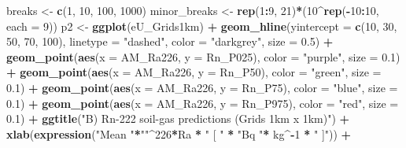 \documentclass[
  12pt,
]{article}
\newenvironment{Shaded}{\begin{snugshade}}{\end{snugshade}}
\newcommand{\DataTypeTok}[1]{\textcolor[rgb]{0.13,0.29,0.53}{#1}}
\newcommand{\DecValTok}[1]{\textcolor[rgb]{0.00,0.00,0.81}{#1}}
\newcommand{\FloatTok}[1]{\textcolor[rgb]{0.00,0.00,0.81}{#1}}
\newcommand{\KeywordTok}[1]{\textcolor[rgb]{0.13,0.29,0.53}{\textbf{#1}}}
\newcommand{\NormalTok}[1]{#1}
\newcommand{\OperatorTok}[1]{\textcolor[rgb]{0.81,0.36,0.00}{\textbf{#1}}}
\newcommand{\StringTok}[1]{\textcolor[rgb]{0.31,0.60,0.02}{#1}}
\begin{document}
\begin{Shaded}
\begin{Highlighting}[]
\NormalTok{breaks \textless{}{-}}\StringTok{ }\KeywordTok{c}\NormalTok{(}\DecValTok{1}\NormalTok{, }\DecValTok{10}\NormalTok{, }\DecValTok{100}\NormalTok{, }\DecValTok{1000}\NormalTok{)}
\NormalTok{minor\_breaks \textless{}{-}}\StringTok{ }\KeywordTok{rep}\NormalTok{(}\DecValTok{1}\OperatorTok{:}\DecValTok{9}\NormalTok{, }\DecValTok{21}\NormalTok{)}\OperatorTok{*}\NormalTok{(}\DecValTok{10}\OperatorTok{\^{}}\KeywordTok{rep}\NormalTok{(}\OperatorTok{{-}}\DecValTok{10}\OperatorTok{:}\DecValTok{10}\NormalTok{, }\DataTypeTok{each =} \DecValTok{9}\NormalTok{))}
\NormalTok{p2 \textless{}{-}}\StringTok{ }\KeywordTok{ggplot}\NormalTok{(eU\_Grids1km) }\OperatorTok{+}
\StringTok{  }\KeywordTok{geom\_hline}\NormalTok{(}\DataTypeTok{yintercept =} \KeywordTok{c}\NormalTok{(}\DecValTok{10}\NormalTok{, }\DecValTok{30}\NormalTok{, }\DecValTok{50}\NormalTok{, }\DecValTok{70}\NormalTok{, }\DecValTok{100}\NormalTok{),}
             \DataTypeTok{linetype =} \StringTok{"dashed"}\NormalTok{, }\DataTypeTok{color =} \StringTok{"darkgrey"}\NormalTok{, }\DataTypeTok{size =} \FloatTok{0.5}\NormalTok{) }\OperatorTok{+}
\StringTok{  }\KeywordTok{geom\_point}\NormalTok{(}\KeywordTok{aes}\NormalTok{(}\DataTypeTok{x =}\NormalTok{ AM\_Ra226, }\DataTypeTok{y =}\NormalTok{ Rn\_P025),}
             \DataTypeTok{color =} \StringTok{"purple"}\NormalTok{, }\DataTypeTok{size =} \FloatTok{0.1}\NormalTok{) }\OperatorTok{+}
\StringTok{  }\KeywordTok{geom\_point}\NormalTok{(}\KeywordTok{aes}\NormalTok{(}\DataTypeTok{x =}\NormalTok{ AM\_Ra226, }\DataTypeTok{y =}\NormalTok{ Rn\_P50),}
             \DataTypeTok{color =} \StringTok{"green"}\NormalTok{, }\DataTypeTok{size =} \FloatTok{0.1}\NormalTok{) }\OperatorTok{+}
\StringTok{  }\KeywordTok{geom\_point}\NormalTok{(}\KeywordTok{aes}\NormalTok{(}\DataTypeTok{x =}\NormalTok{ AM\_Ra226, }\DataTypeTok{y =}\NormalTok{ Rn\_P75),}
             \DataTypeTok{color =} \StringTok{"blue"}\NormalTok{, }\DataTypeTok{size =} \FloatTok{0.1}\NormalTok{) }\OperatorTok{+}
\StringTok{  }\KeywordTok{geom\_point}\NormalTok{(}\KeywordTok{aes}\NormalTok{(}\DataTypeTok{x =}\NormalTok{ AM\_Ra226, }\DataTypeTok{y =}\NormalTok{ Rn\_P975),}
             \DataTypeTok{color =} \StringTok{"red"}\NormalTok{, }\DataTypeTok{size =} \FloatTok{0.1}\NormalTok{) }\OperatorTok{+}
\StringTok{  }\KeywordTok{ggtitle}\NormalTok{(}\StringTok{"B) Rn{-}222 soil{-}gas predictions (Grids 1km x 1km)"}\NormalTok{) }\OperatorTok{+}\StringTok{ }
\StringTok{  }\KeywordTok{xlab}\NormalTok{(}\KeywordTok{expression}\NormalTok{(}\StringTok{"Mean "}\OperatorTok{*}\StringTok{""}\OperatorTok{\^{}}\DecValTok{226}\OperatorTok{*}\NormalTok{Ra }\OperatorTok{*}\StringTok{ " [ "} \OperatorTok{*}\StringTok{ "Bq "}\OperatorTok{*}\StringTok{ }\NormalTok{kg}\OperatorTok{\^{}{-}}\DecValTok{1} \OperatorTok{*}\StringTok{ " ]"}\NormalTok{)) }\OperatorTok{+}\StringTok{ }

\end{Highlighting}
\end{Shaded}
\end{document}
